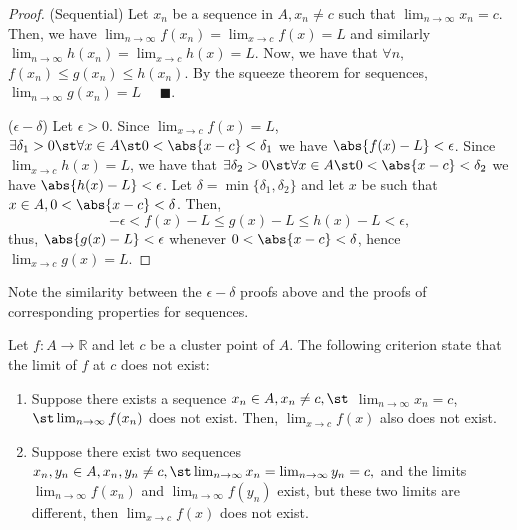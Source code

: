 \documentclass[12pt]{article}
\renewcommand{\qedsymbol}{$\blacksquare$}
\begin{document}
\begin{proof}
  (Sequential) Let $x_n$ be a sequence in $A, x_n \neq c$ such that $\lim_{n\to\infty} x_n = c$. Then, we have $\lim_{n\to\infty} f(x_n) = \lim_{x \to c} f(x) = L$ and similarly $\lim_{n\to\infty} h(x_n) = \lim_{x \to c} h(x) = L$. Now, we have that $\forall n,$ $f(x_n) \leq g(x_n) \leq h(x_n)$. By the squeeze theorem for sequences, $\lim_{n\to\infty} g(x_n) = L \quad$ \qedsymbol.

  \noindent ($\epsilon-\delta$) Let $\epsilon > 0$. Since $\lim_{x\to c} f(x) = L$, $\exists \delta_1 > 0 \st \forall x \in A \st 0 < \abs{x - c} < \delta_1$ we have $\abs{f(x) - L}< \epsilon$. Since $\lim_{x \to c} h(x) = L$, we have that $\exists \delta_2>0 \st \forall x \in A \st 0 < \abs{x - c} < \delta_2$ we have $\abs{h(x) - L} < \epsilon$. Let $\delta = \min\{\delta_1, \delta_2\}$ and let $x$ be such that $x \in A, 0 < \abs{x - c} < \delta$. Then, \[
    - \epsilon < f(x) - L \leq g(x) - L \leq h(x) - L < \epsilon,
    \]
    thus, $\abs{g(x) - L} < \epsilon$ whenever $0 < \abs{x - c} < \delta$, hence $\lim_{x \to c} g(x) = L$.
\end{proof}
\begin{remark}
  Note the similarity between the $\epsilon-\delta$ proofs above and the proofs of corresponding properties for sequences.
\end{remark}

\begin{definition}
  Let $f : A \to \mathbb{R}$ and let $c$ be a cluster point of $A$. The following criterion state that the limit of $f$ at $c$ does not exist:
  \begin{enumerate}
    \item Suppose there exists a sequence $x_n \in A, x_n \neq c, \st$ $\lim_{n \to \infty} x_n = c$, \newline$\st \lim_{n \to \infty} f(x_n)$ does not exist. Then, $\lim_{x \to c} f(x)$ also does not exist.
    \item  Suppose there exist two sequences $x_n, y_n \in A, x_n, y_n \neq c, \st \lim_{n\to\infty} x_n = \lim_{n\to\infty} y_n = c,$ and the limits $\lim_{n\to\infty} f(x_n)$ and $\lim_{n\to\infty} f(y_n)$ exist, but these two limits are different, then $\lim_{x\to c} f(x)$ does not exist.
  \end{enumerate}
\end{definition}
\end{document}
